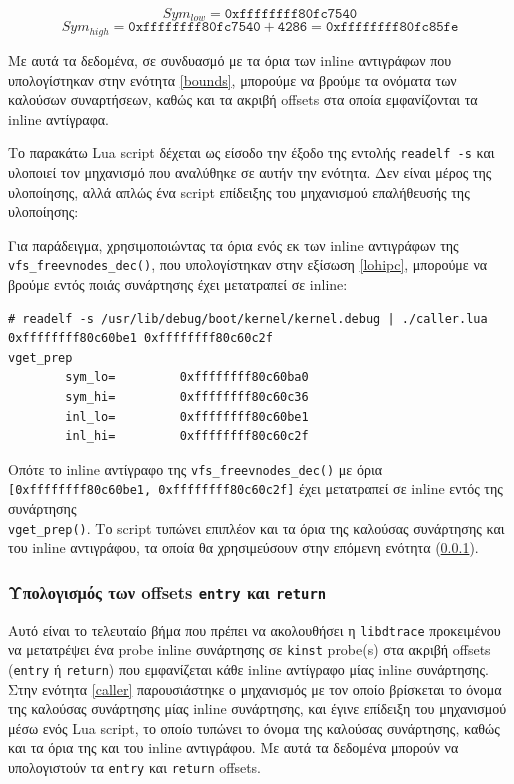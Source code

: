 \documentclass[12pt]{article}
\begin{document}
\[
	Sym_{low} = \mathtt{0xffffffff80fc7540}
\]
\[
	Sym_{high} = \mathtt{0xffffffff80fc7540} + \mathtt{4286} =
	\mathtt{0xffffffff80fc85fe}
\]

Με αυτά τα δεδομένα, σε συνδυασμό με τα όρια των inline αντιγράφων που
υπολογίστηκαν στην ενότητα \ref{bounds}, μπορούμε να βρούμε τα ονόματα των
καλούσων συναρτήσεων, καθώς και τα ακριβή offsets στα οποία εμφανίζονται τα
inline αντίγραφα.

Το παρακάτω Lua script δέχεται ως είσοδο την έξοδο της εντολής
\lstinline{readelf -s} και υλοποιεί τον μηχανισμό που αναλύθηκε σε αυτήν την
ενότητα. Δεν είναι μέρος της υλοποίησης, αλλά απλώς ένα script επίδειξης του
μηχανισμού επαλήθευσής της υλοποίησης:



Για παράδειγμα, χρησιμοποιώντας τα όρια ενός εκ των inline αντιγράφων της
\lstinline{vfs_freevnodes_dec()}, που υπολογίστηκαν στην εξίσωση \ref{lohipc},
μπορούμε να βρούμε εντός ποιάς συνάρτησης έχει μετατραπεί σε inline:

\begin{lstlisting}
# readelf -s /usr/lib/debug/boot/kernel/kernel.debug | ./caller.lua 0xffffffff80c60be1 0xffffffff80c60c2f
vget_prep
        sym_lo=         0xffffffff80c60ba0
        sym_hi=         0xffffffff80c60c36
        inl_lo=         0xffffffff80c60be1
        inl_hi=         0xffffffff80c60c2f
\end{lstlisting}

Οπότε το inline αντίγραφο της \lstinline{vfs_freevnodes_dec()} με όρια \\
\lstinline{[0xffffffff80c60be1, 0xffffffff80c60c2f]} έχει μετατραπεί σε inline
εντός της συνάρτησης \\ \lstinline{vget_prep()}. Το script τυπώνει επιπλέον και
τα όρια της καλούσας συνάρτησης και του inline αντιγράφου, τα οποία θα
χρησιμεύσουν στην επόμενη ενότητα (\ref{offs}).

\subsubsection{Υπολογισμός των offsets \lstinline{entry} και \lstinline{return}} \label{offs}

Αυτό είναι το τελευταίο βήμα που πρέπει να ακολουθήσει η \lstinline{libdtrace}
προκειμένου να μετατρέψει ένα probe inline συνάρτησης σε \lstinline{kinst}
probe(s) στα ακριβή offsets (\lstinline{entry} ή \lstinline{return}) που
εμφανίζεται κάθε inline αντίγραφο μίας inline συνάρτησης. Στην ενότητα
\ref{caller} παρουσιάστηκε ο μηχανισμός με τον οποίο βρίσκεται το όνομα της
καλούσας συνάρτησης μίας inline συνάρτησης, και έγινε επίδειξη του μηχανισμού
μέσω ενός Lua script, το οποίο τυπώνει το όνομα της καλούσας συνάρτησης, καθώς
και τα όρια της και του inline αντιγράφου. Με αυτά τα δεδομένα μπορούν να
υπολογιστούν τα \lstinline{entry} και \lstinline{return} offsets.
\end{document}

